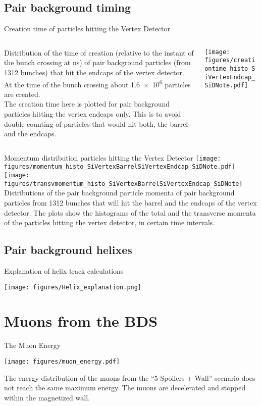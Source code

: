 \documentclass[xcolor={dvipsnames}]{beamer}
\begin{document}
\subsection{Pair background timing}
\begin{frame}{Creation time of particles hitting the Vertex Detector}
\begin{columns}
 \begin{column}{0.4\textwidth}
Distribution of the time of creation (relative to the instant of the bunch crossing at \unit[0]{ns}) of pair background particles (from 1312 bunches) that hit the endcaps of the vertex detector.
At the time of the bunch crossing about \num{1.6e6} particles are created.\\
{\footnotesize The creation time here is plotted for pair background particles hitting the vertex endcaps only. This is to avoid double counting of particles that would hit both, the barrel and the endcaps.}
 \end{column}
 \begin{column}{0.6\textwidth}
 \texttt{[image: figures/creationtime\_histo\_SiVertexEndcap\_SiDNote.pdf]}
 \end{column}
\end{columns}
\end{frame}

\begin{frame}{Momentum distribution particles hitting the Vertex Detector}
  \texttt{[image: figures/momentum\_histo\_SiVertexBarrelSiVertexEndcap\_SiDNote.pdf]}
  \texttt{[image: figures/transvmomentum\_histo\_SiVertexBarrelSiVertexEndcap\_SiDNote]}\\
  Distributions of the pair background particle momenta of pair background particles from 1312 bunches that will hit the barrel and the endcaps of the vertex detector.
  The plots show the histograms of the total and the transverse momenta of the particles hitting the vertex detector, in certain time intervals.
\end{frame}

\subsection{Pair background helixes}
\begin{frame}{Explanation of helix track calculations}
 \begin{center}
  \texttt{[image: figures/Helix\_explanation.png]}
\end{center}
\end{frame}

\section{Muons from the BDS}
\begin{frame}{The Muon Energy}
\begin{center}
  \texttt{[image: figures/muon\_energy.pdf]}
\end{center}
The energy distribution of the muons from the ``5 Spoilers + Wall'' scenario does not reach the same maximum energy. The muons are decelerated and stopped within the magnetized wall.
\end{frame}
\end{document}
